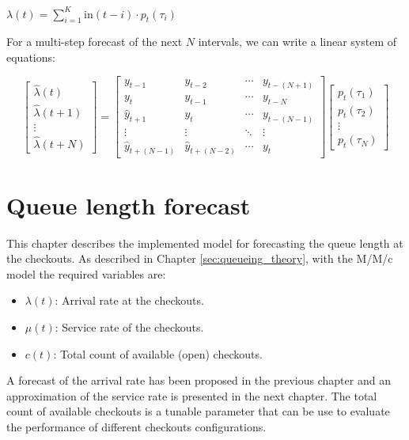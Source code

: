 $ \lambda(t) = \sum_{i=1}^{K} \text{in}(t-i) \cdot p_t(\tau_i) $

For a multi-step forecast of the next $ N $ intervals, we can write a linear system of equations:

\[
  \begin{bmatrix}\hat{\lambda}(t) \\ \hat{\lambda}(t+1) \\ \vdots \\ \hat{\lambda}(t+N)\end{bmatrix}
  =
  \begin{bmatrix}
    y_{t-1}           & y_{t-2}           & \cdots & y_{t-(N+1)} \\
    y_{t}             & y_{t-1}           & \cdots & y_{t-N}     \\
    \hat{y}_{t+1}     & y_{t}             & \cdots & y_{t-(N-1)} \\
    \vdots            & \vdots            & \ddots & \vdots      \\
    \hat{y}_{t+(N-1)} & \hat{y}_{t+(N-2)} & \cdots & y_{t}
  \end{bmatrix}
  \begin{bmatrix}p_t(\tau_1) \\ p_t(\tau_2) \\ \vdots \\ p_t(\tau_N)\end{bmatrix}
\]

\section{Queue length forecast}
\label{sec:queue_length_forecasting}
This chapter describes the implemented model for forecasting the queue length at the checkouts. As described in Chapter \ref{sec:queueing_theory}, with the M/M/c model the required variables are:
\begin{itemize}
  \item \( \lambda(t) \): Arrival rate at the checkouts.
  \item \( \mu(t) \): Service rate of the checkouts.
  \item \( c(t) \): Total count of available (open) checkouts.
\end{itemize}
A forecast of the arrival rate has been proposed in the previous chapter and an approximation of the service rate is presented in the next chapter. The total count of available checkouts is a tunable parameter that can be use to evaluate the performance of different checkouts configurations.

